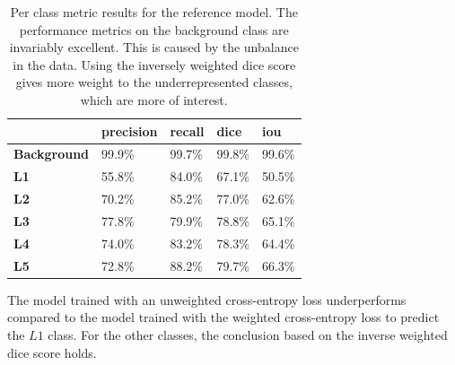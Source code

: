 \begin{table}
    \begin{tabular}{l|llll}
        \toprule
        & \textbf{precision} & \textbf{recall} & \textbf{dice} & \textbf{iou} \\ \hline
        \textbf{Background} & 99.9\%             & 99.7\%          & 99.8\%        & 99.6\%       \\
        \textbf{L1}         & 55.8\%             & 84.0\%          & 67.1\%        & 50.5\%       \\
        \textbf{L2}         & 70.2\%             & 85.2\%          & 77.0\%        & 62.6\%       \\
        \textbf{L3}         & 77.8\%             & 79.9\%          & 78.8\%        & 65.1\%       \\
        \textbf{L4}         & 74.0\%             & 83.2\%          & 78.3\%        & 64.4\%       \\
        \textbf{L5}         & 72.8\%             & 88.2\%          & 79.7\%        & 66.3\%      \\
        \bottomrule
        \end{tabular}
    
        \caption{Per class metric results for the reference model. 
        The performance metrics on the background class are invariably excellent. This is caused by the unbalance in the data.
        Using the inversely weighted dice score gives more weight to the underrepresented classes, which are more of interest.
        \label{tab:full_performanceTable}
        }
    \end{table}
The model trained with an unweighted cross-entropy loss underperforms compared to the model trained with the weighted cross-entropy loss to predict the $L1$ class.
For the other classes, the conclusion based on the inverse weighted dice score holds.

